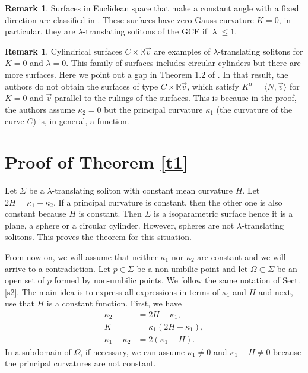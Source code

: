 \documentclass[a4paper,12pt]{amsart}
\theoremstyle{definition}
\newtheorem{remark}[theorem]{Remark}
\def\r{\mathbb R}
\begin{document}
 \begin{remark} Surfaces in Euclidean space that make a constant angle with a fixed direction are classified in \cite{mn}. These surfaces have zero Gauss curvature $K=0$, in particular, they are $\lambda$-translating solitons of the GCF if $|\lambda|\leq 1$. 
 \end{remark}
 
 \begin{remark} Cylindrical surfaces $C\times\r\vec{v}$ are examples of $\lambda$-translating solitons for $K=0$ and $\lambda=0$. This family of surfaces includes circular cylinders but there are more surfaces. Here we point out a gap in Theorem 1.2 of \cite{fl}. In that result, the authors do not obtain the surfaces of type $C\times\r\vec{v}$, which satisfy $K^\alpha=\langle N,\vec{v}\rangle$ for $K=0$ and $\vec{v}$ parallel to the rulings of the surfaces. This is because in the proof, the authors assume $\kappa_2=0$ but the principal curvature $\kappa_1$ (the curvature of the curve $C$) is, in general, a function.
 \end{remark}
\section{Proof of Theorem \ref{t1} }\label{s4}
 
Let $\Sigma$ be a $\lambda$-translating soliton with constant mean curvature $H$. Let  $2H=\kappa_1+\kappa_2$.  If a principal curvature is constant, then the other one is also constant because $H$ is constant. Then $\Sigma$ is a isoparametric surface hence it  is a plane, a sphere or a circular cylinder. However, spheres are not $\lambda$-translating solitons. This proves the theorem for this situation. 

From now on, we will assume that neither  $\kappa_1$ nor $\kappa_2$ are constant and we will arrive to a contradiction. Let $p\in \Sigma$ be a non-umbilic point and let   $\Omega\subset \Sigma$ be an open set of $p$ formed by non-umbilic points. We follow the same notation of Sect.   \ref{s2}. The main idea is to express all expressions in terms of $\kappa_1$ and $H$ and next, use that $H$ is a constant function. First, we have
\begin{equation}\label{case1}
\begin{split}
\kappa_2&=2H-\kappa_1,\\
 K&=\kappa_1(2H-\kappa_1),\\		
\kappa_1-\kappa_2&=2(\kappa_1-H).
\end{split}
\end{equation}
In a subdomain of $\Omega$, if necessary, we can assume $\kappa_1\not=0$ and $\kappa_1-H\not=0$ because the principal curvatures are not constant. 
\end{document}
